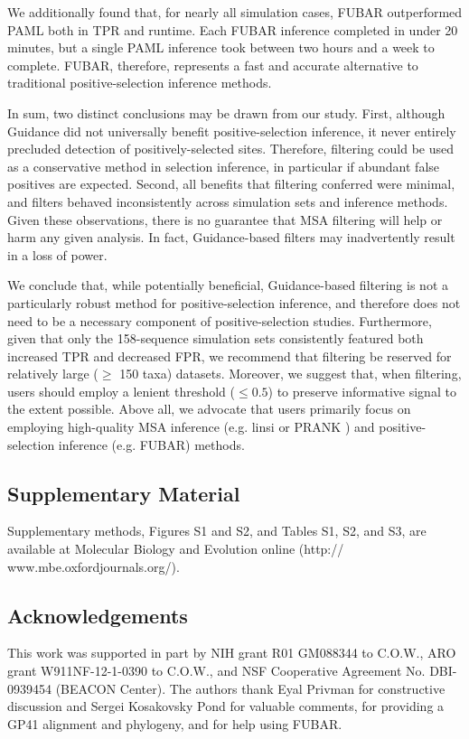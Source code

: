 \documentclass[11pt]{article}
\begin{document}
We additionally found that, for nearly all simulation cases, FUBAR outperformed PAML both in TPR and runtime. Each FUBAR inference completed in under 20 minutes, but a single PAML inference took between two hours and a week to complete. FUBAR, therefore, represents a fast and accurate alternative to traditional positive-selection inference methods.

In sum, two distinct conclusions may be drawn from our study. First, although Guidance did not universally benefit positive-selection inference, it never entirely precluded detection of positively-selected sites. Therefore, filtering could be used as a conservative method in selection inference, in particular if abundant false positives are expected. Second, all benefits that filtering conferred were minimal, and filters behaved inconsistently across simulation sets and inference methods. Given these observations, there is no guarantee that MSA filtering will help or harm any given analysis. In fact, Guidance-based filters may inadvertently result in a loss of power. 

We conclude that, while potentially beneficial, Guidance-based filtering is not a particularly robust method for positive-selection inference, and therefore does not need to be a necessary component of positive-selection studies. Furthermore, given that only the 158-sequence simulation sets consistently featured both increased TPR and decreased FPR, we recommend that filtering be reserved for relatively large ($\geq$ 150 taxa) datasets. Moreover, we suggest that, when filtering, users should employ a lenient threshold ($\leq0.5$) to preserve informative signal to the extent possible. Above all, we advocate that users primarily focus on employing high-quality MSA inference (e.g. linsi \citep{Katoh2005} or PRANK \citep{Loytynoja2008}) and positive-selection inference (e.g. FUBAR) methods. 


\subsection*{Supplementary Material}
Supplementary methods, Figures S1 and S2, and Tables S1, S2, and S3, are available at Molecular Biology and Evolution online (http:// www.mbe.oxfordjournals.org/).


\subsection*{Acknowledgements}
 This work was supported in part by NIH grant R01 GM088344 to C.O.W., ARO grant W911NF-12-1-0390 to  C.O.W.,  and NSF Cooperative Agreement No. DBI-0939454 (BEACON Center). The authors thank Eyal Privman for constructive discussion and Sergei Kosakovsky Pond for valuable comments, for providing a GP41 alignment and phylogeny, and for help using FUBAR.
\end{document}
